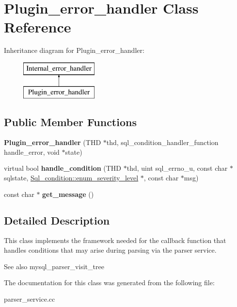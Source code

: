 \hypertarget{classPlugin__error__handler}{}\section{Plugin\+\_\+error\+\_\+handler Class Reference}
\label{classPlugin__error__handler}
Inheritance diagram for Plugin\+\_\+error\+\_\+handler\+:\begin{figure}[H]
\begin{center}
\leavevmode
\includegraphics[height=2.000000cm]{classPlugin__error__handler}
\end{center}
\end{figure}
\subsection*{Public Member Functions}
\begin{DoxyCompactItemize}
\item 
\mbox{\label{classPlugin__error__handler_a90f0ad2c2b992d38911368f049b21522}} 
{\bfseries Plugin\+\_\+error\+\_\+handler} (T\+HD $\ast$thd, sql\+\_\+condition\+\_\+handler\+\_\+function handle\+\_\+error, void $\ast$state)
\item 
\mbox{\label{classPlugin__error__handler_ad508e8248ec17b6a5aaf1627e38b05c6}} 
virtual bool {\bfseries handle\+\_\+condition} (T\+HD $\ast$thd, uint sql\+\_\+errno\+\_\+u, const char $\ast$sqlstate, \mbox{\hyperlink{classSql__condition_ab0602581e19cddb609bfe10c44be4e83}{Sql\+\_\+condition\+::enum\+\_\+severity\+\_\+level}} $\ast$, const char $\ast$msg)
\item 
\mbox{\label{classPlugin__error__handler_a6f16e74b80f384f9d0475243b3a5c4d1}} 
const char $\ast$ {\bfseries get\+\_\+message} ()
\end{DoxyCompactItemize}


\subsection{Detailed Description}
This class implements the framework needed for the callback function that handles conditions that may arise during parsing via the parser service.

\begin{DoxySeeAlso}{See also}
mysql\+\_\+parser\+\_\+visit\+\_\+tree 
\end{DoxySeeAlso}


The documentation for this class was generated from the following file\+:\begin{DoxyCompactItemize}
\item 
parser\+\_\+service.\+cc\end{DoxyCompactItemize}
